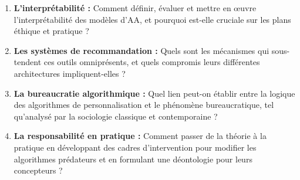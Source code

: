 \begin{enumerate}[label=\textbf{Q\arabic*:}, wide, labelindent=0pt]
    \item \textbf{L'interprétabilité :} Comment définir, évaluer et mettre en œuvre l'interprétabilité des modèles d'AA, et pourquoi est-elle cruciale sur les plans éthique et pratique ?
    \vspace{2em}
    \item \textbf{Les systèmes de recommandation :} Quels sont les mécanismes qui sous-tendent ces outils omniprésents, et quels compromis leurs différentes architectures impliquent-elles ?
    \item \textbf{La bureaucratie algorithmique :} Quel lien peut-on établir entre la logique des algorithmes de personnalisation et le phénomène bureaucratique, tel qu'analysé par la sociologie classique et contemporaine ?
    \item \textbf{La responsabilité en pratique :} Comment passer de la théorie à la pratique en développant des cadres d'intervention pour modifier les algorithmes prédateurs et en formulant une déontologie pour leurs concepteurs ?
\end{enumerate}

